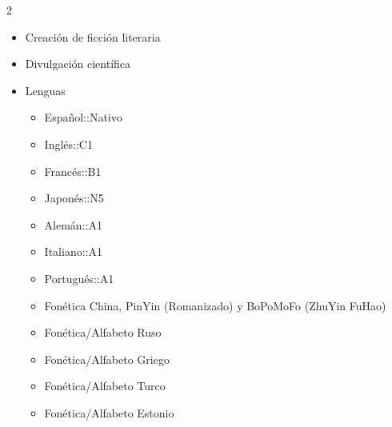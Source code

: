 \documentclass[11pt,letterpaper]{article}
\begin{document}
\begin{multicols}{2}
\begin{itemize}[leftmargin=*]
\begin{itemize}
\begin{itemize}
            \item GyouSho
            \item SouSho
            \item KaiSho
        \end{itemize}
    \end{itemize}
    \item \colorbox{vinotinto}{\color{white}Creación de ficción literaria}
    \item \colorbox{vinotinto}{\color{white}Divulgación científica}
    \item \colorbox{vinotinto}{\color{white}Lenguas}
    \begin{itemize}
        \item Español::Nativo
        \item Inglés::C1
        \item Francés::B1
        \item Japonés::N5
        \item Alemán::A1
        \item Italiano::A1
        \item Portugués::A1
        \item Fonética China, PinYin (Romanizado) y BoPoMoFo (ZhuYin FuHao)
        \item Fonética/Alfabeto Ruso 
        \item Fonética/Alfabeto Griego
        \item Fonética/Alfabeto Turco
        \item Fonética/Alfabeto Estonio
    \end{itemize}
\end{itemize}
\end{multicols}

\vspace{1.5em}

\end{document}
